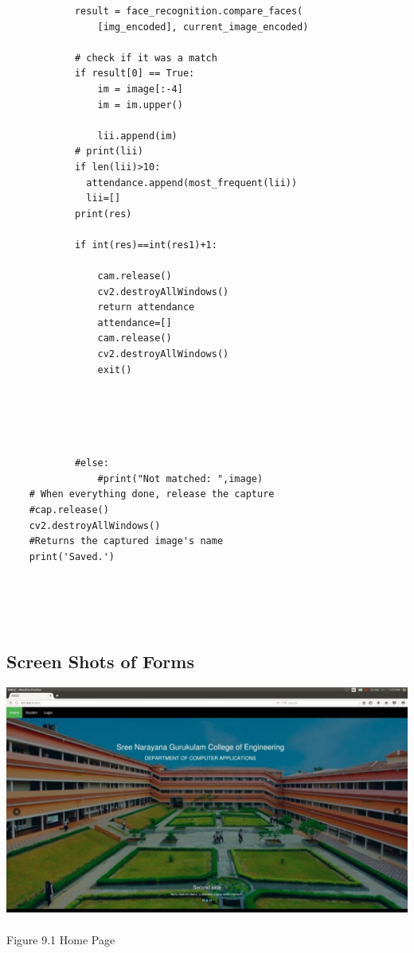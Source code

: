 \documentclass[a4paper, 12pt]{report}
\begin{document}
\begin{lstlisting}
			result = face_recognition.compare_faces(
				[img_encoded], current_image_encoded)
			
			# check if it was a match
			if result[0] == True:
				im = image[:-4]
				im = im.upper()
				
				lii.append(im)
			# print(lii)
			if len(lii)>10:
			  attendance.append(most_frequent(lii))
			  lii=[]
			print(res)        
				
			if int(res)==int(res1)+1:
				
				cam.release()
				cv2.destroyAllWindows()
				return attendance
				attendance=[]
				cam.release()
				cv2.destroyAllWindows()
				exit()
				
					

					
				
			#else:
				#print("Not matched: ",image)
	# When everything done, release the capture
	#cap.release()
	cv2.destroyAllWindows()
	#Returns the captured image's name
	print('Saved.')





\end{lstlisting}












\subsection{Screen Shots of Forms
}
 \includegraphics[width=.9\textwidth]{a55}\paragraph{}

     \hspace{5cm}Figure 9.1 Home Page
\end{document}
